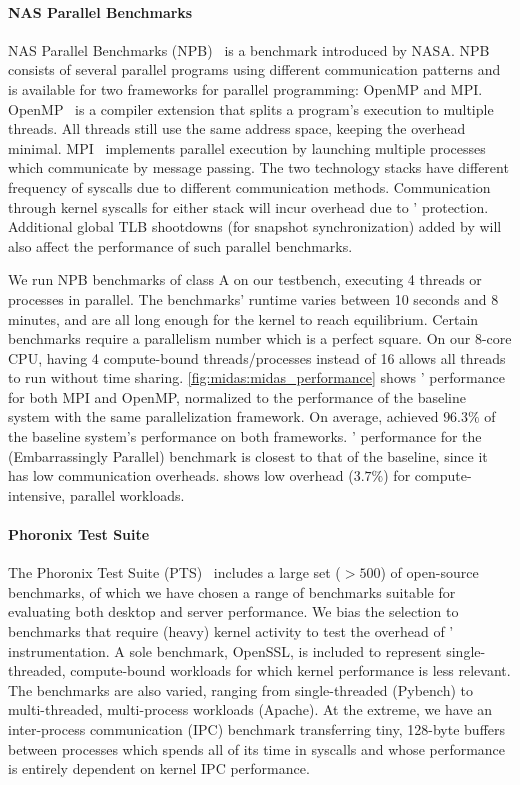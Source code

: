 \paragraph{NAS Parallel Benchmarks}
NAS Parallel Benchmarks (NPB)~\cite{npb} is a benchmark introduced by
NASA.
NPB consists of several parallel programs using different communication
patterns and is available for two frameworks for parallel programming:
OpenMP and MPI.
OpenMP~\cite{dagum1998openmp} is a compiler extension that splits a
program's execution to multiple threads.
All threads still use the same address space, keeping the overhead minimal.
MPI~\cite{snir1998mpi} implements parallel execution by launching multiple
processes which communicate by message passing.
The two technology stacks have different frequency of syscalls due to
different communication methods.
Communication through kernel syscalls for either stack will incur overhead
due to \midas' protection.
Additional global TLB shootdowns (for snapshot synchronization) added by
\midas will also affect the performance of such parallel benchmarks.

We run NPB benchmarks of class A on our testbench, executing
4 threads or processes in parallel.
The benchmarks' runtime varies between 10 seconds and 8 minutes,
and are all long enough for the kernel to reach equilibrium.
Certain benchmarks require a parallelism number which is a perfect square.
On our 8-core CPU, having 4 compute-bound threads/processes instead of 16 allows
all threads to run without time sharing.
\autoref{fig:midas:midas_performance} shows \midas' performance for both MPI and OpenMP,
normalized to the performance of the baseline system with the same parallelization
framework.
On average, \midas achieved $96.3\%$ of the baseline system's performance on
both frameworks.
\midas' performance for the  (Embarrassingly Parallel) benchmark is
closest to that of the baseline, since it has low communication overheads.
\midas shows low overhead ($3.7\%$) for compute-intensive, parallel workloads.


\paragraph{Phoronix Test Suite}
The Phoronix Test Suite (PTS)~\cite{pts} includes a large set ($>500$) of
open-source benchmarks, of which we have chosen a range of benchmarks
suitable for evaluating both desktop and server performance.
We bias the selection to benchmarks that require (heavy) kernel activity to
test the overhead of \midas' instrumentation.
A sole benchmark, OpenSSL, is included to represent single-threaded,
compute-bound workloads for which kernel performance is less relevant.
The benchmarks are also varied, ranging from single-threaded (Pybench) to
multi-threaded, multi-process workloads (Apache).
At the extreme, we have an inter-process communication (IPC) benchmark 
transferring tiny, 128-byte
buffers between processes which spends all of its time in syscalls
and whose performance is entirely dependent on kernel IPC performance.

